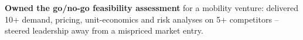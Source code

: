 
\vspace{1pt}
\begin{resume_list}
  \item \textbf{Owned the go/no-go feasibility assessment} for a mobility venture: delivered 10+ demand, pricing, unit-economics and risk analyses on 5+ competitors -- steered leadership away from a mispriced market entry.
\end{resume_list}
